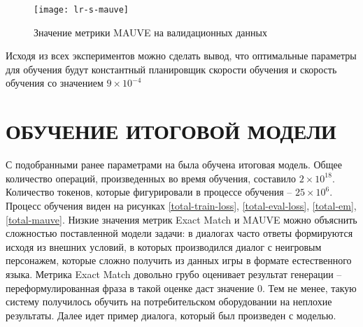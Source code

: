 \begin{figure}[H]
  \centering
  \texttt{[image: lr-s-mauve]}
  \caption{Значение метрики MAUVE на валидационных данных}
  \label{lr-mauve}
\end{figure}

Исходя из всех экспериментов можно сделать вывод, что оптимальные параметры для обучения будут константный планировщик скорости обучения и скорость обучения со значением $9 \times 10^{-4}$

\section{ОБУЧЕНИЕ ИТОГОВОЙ МОДЕЛИ}

С подобранными ранее параметрами на была обучена итоговая модель. Общее количество операций, произведенных во время обучения, составило $2 \times 10^{18}$. Количество токенов, которые фигурировали в процессе обучения -- $25 \times 10^{6}$. Процесс обучения виден на рисунках \ref{total-train-loss}, \ref{total-eval-loss}, \ref{total-em}, \ref{total-mauve}. Низкие значения метрик Exact Match и MAUVE можно объяснить сложностью поставленной модели задачи: в диалогах часто ответы формируются исходя из внешних условий, в которых производился диалог с неигровым персонажем, которые сложно получить из данных игры в формате естественного языка. Метрика Exact Match довольно грубо оценивает результат генерации -- переформулированная фраза в такой оценке даст значение 0. Тем не менее, такую систему получилось обучить на потребительском оборудовании на неплохие результаты. Далее идет пример диалога, который был произведен с моделью.

